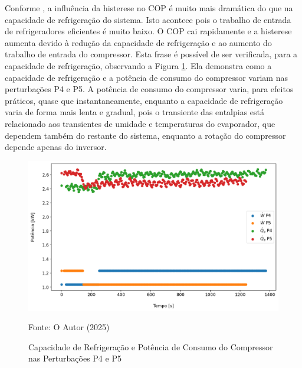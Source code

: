 Conforme \textcite{MASCHE2021302}, a influência da histerese no COP é muito mais dramática do que na capacidade de refrigeração do sistema. Isto acontece pois o trabalho de entrada de refrigeradores eficientes é muito baixo. O COP cai rapidamente e a histerese aumenta devido à redução da capacidade de refrigeração e ao aumento do trabalho de entrada do compressor. Esta frase é possível de ser verificada, para a capacidade de refrigeração, observando a Figura \ref{fig:Capacidade de Resfriamento e Potência de Entrada do Compressor P4 e P5}. Ela demonstra como a capacidade de refrigeração e a potência de consumo do compressor variam nas perturbações P4 e P5. A potência de consumo do compressor varia, para efeitos práticos, quase que instantaneamente, enquanto a capacidade de refrigeração varia de forma mais lenta e gradual, pois o transiente das entalpias está relacionado aos transientes de umidade e temperaturas do evaporador, que dependem também do restante do sistema, enquanto a rotação do compressor depende apenas do inversor.
\newpage
\begin{figure}[h]
    \centering
    \includegraphics[width=1\linewidth]{FigurasdoTexto/Qe e W Histerese.png}
    \caption{Capacidade de Refrigeração e Potência de Consumo do Compressor nas Perturbações P4 e P5}
    \label{fig:Capacidade de Resfriamento e Potência de Entrada do Compressor P4 e P5}
    {\footnotesize Fonte: O Autor (2025)}
\end{figure}

